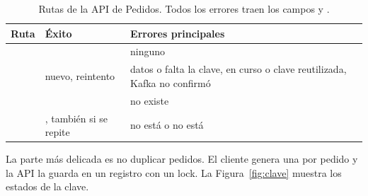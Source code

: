 \begin{table}[H]
\centering
\small
\begin{tabularx}{\textwidth}{@{}l l Y@{}}
\toprule
\textbf{Ruta} & \textbf{Éxito} & \textbf{Errores principales} \\
\midrule
{} &  & ninguno \\
 &  nuevo,  reintento &  datos o falta la clave,  en curso o clave reutilizada,  Kafka no confirmó \\
 &  &  no existe \\
 & , también si se repite &  no está  o no está  \\
\bottomrule
\end{tabularx}
\caption{Rutas de la API de Pedidos. Todos los errores traen los campos  y .}
\label{tab:rutas}
\end{table}

La parte más delicada es no duplicar pedidos. El cliente genera una  por pedido y la API la guarda en un registro con un lock. La Figura~\ref{fig:clave} muestra los estados de la clave.

